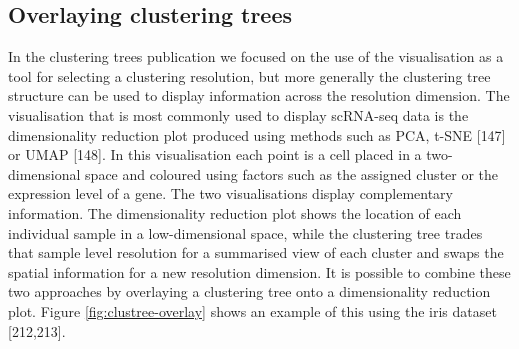 \documentclass[11pt,a4paper,titlepage,twoside,openright]{style/unimelbthesis}
\theoremstyle{definition}
\theoremstyle{definition}
\theoremstyle{definition}
\theoremstyle{remark}
\begin{document}
\begin{mainmatter}
\clearpage

\hypertarget{clustree-overlay}{%
\section{Overlaying clustering trees}\label{clustree-overlay}}

In the clustering trees publication we focused on the use of the visualisation as a tool for selecting a clustering resolution, but more generally the clustering tree structure can be used to display information across the resolution dimension. The visualisation that is most commonly used to display scRNA-seq data is the dimensionality reduction plot produced using methods such as PCA, t-SNE {[}147{]} or UMAP {[}148{]}. In this visualisation each point is a cell placed in a two-dimensional space and coloured using factors such as the assigned cluster or the expression level of a gene. The two visualisations display complementary information. The dimensionality reduction plot shows the location of each individual sample in a low-dimensional space, while the clustering tree trades that sample level resolution for a summarised view of each cluster and swaps the spatial information for a new resolution dimension. It is possible to combine these two approaches by overlaying a clustering tree onto a dimensionality reduction plot. Figure \ref{fig:clustree-overlay} shows an example of this using the iris dataset {[}212,213{]}.


\end{mainmatter}
\end{document}

